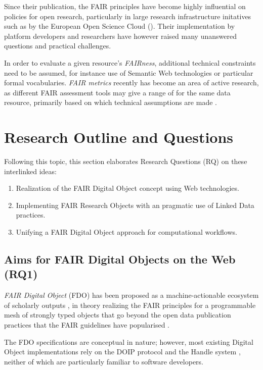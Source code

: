 Since their publication, the FAIR principles have become highly influential on policies for open research, particularly in large research infrastructure initatives such as by the European Open Science Cloud (). 
Their implementation by platform developers and researchers have however raised many unanswered questions and practical challenges. 

In order to evaluate a given resource's \emph{FAIRness}, additional technical constraints need to be assumed, for instance use of Semantic Web technologies or particular formal vocabularies. \emph{FAIR metrics} recently has become an area of active research, as different FAIR assessment tools may give a range of for the same data resource, primarily based on which technical assumptions are made \cite{Wilkinson 2022a}.



\section{Research Outline and Questions}
\label{intro:outline}

Following this topic, this section elaborates Research Questions (RQ) on these interlinked ideas:

\begin{enumerate}
    \item Realization of the FAIR Digital Object concept using Web technologies.
    \item Implementing FAIR Research Objects with an pragmatic use of Linked Data practices.
    \item Unifying a FAIR Digital Object approach for computational workflows.
\end{enumerate}


\subsection{Aims for FAIR Digital Objects on the Web (RQ1)}
\label{intro:rq1}

\emph{FAIR Digital Object} (FDO) has been proposed as a machine-actionable ecosystem of scholarly outputs \cite{Schultes 2019}, in theory realizing the FAIR principles \cite{Wilkinson 2016} for a programmable mesh of strongly typed objects that go beyond the open data publication practices that the FAIR guidelines have popularised \cite{Jacobsen 2020}.

The FDO specifications \cite{Ivonne 2023} are conceptual in nature; however, most existing Digital Object implementations \cite{Kahn 2006} rely on the DOIP protocol \cite{Reilly 2009} and the Handle system \cite{Sun 2003a}, neither of which are particularly familiar to software developers.

